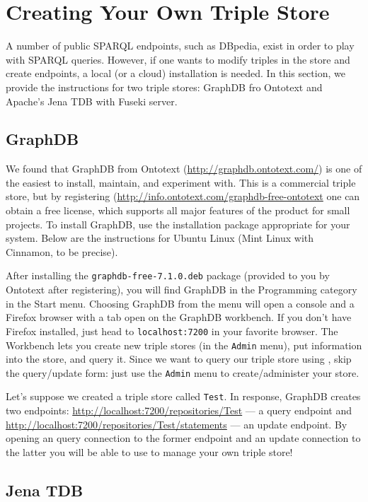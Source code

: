 \section{Creating Your Own Triple Store}

A number of public SPARQL endpoints, such as DBpedia, exist in order to
play with SPARQL queries. However, if one wants to modify triples in the
store and create endpoints, a local (or a cloud) installation is needed.
In this section, we provide the instructions for two triple stores: GraphDB
fro Ontotext and Apache's Jena TDB with Fuseki server.

\subsection{GraphDB}

We found that GraphDB from Ontotext (\url{http://graphdb.ontotext.com/}) is
one of the easiest to install, maintain, and experiment with. This is a
commercial triple store, but by registering
(\url{http://info.ontotext.com/graphdb-free-ontotext} one can obtain a free
license, which supports all major features of the product for small
projects.  To
install GraphDB, use the installation package appropriate for your system.
Below are the instructions for Ubuntu Linux (Mint Linux with Cinnamon, to
be precise).

After installing the \texttt{graphdb-free-7.1.0.deb} package (provided to
you by Ontotext after registering), you will find
GraphDB in the Programming category in the Start menu.
Choosing GraphDB from the menu will open a console and a Firefox browser 
with a tab open on the GraphDB workbench. If you don't have Firefox installed,
just head to \texttt{localhost:7200}  in your favorite browser.
The Workbench lets you create new triple stores (in the \texttt{Admin}
menu), put information into the store, and query it.
Since we want to query our triple store using \ERGO, skip the query/update
form: just use the \texttt{Admin} menu to create/administer your
store.

Let's suppose we created a triple store called \texttt{Test}. 
In response, GraphDB creates two endpoints:
\url{http://localhost:7200/repositories/Test} --- a query endpoint and
\url{http://localhost:7200/repositories/Test/statements} --- an update endpoint.
By opening an \ERGO query connection to the former endpoint
and an update connection to the latter you will be able to
use \ERGO to manage your own triple store!

\subsection{Jena TDB}

